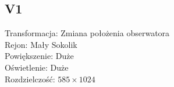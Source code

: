 \subsection{V1}
Transformacja: Zmiana położenia obserwatora\\
Rejon: Mały Sokolik\\
Powiększenie: Duże\\
Oświetlenie: Duże\\
Rozdzielczość: $585 \times 1024$

\begin{figure}[!htb]
\begin{center}
\end{center}
\end{figure}

